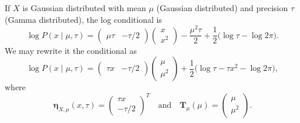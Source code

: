 \begin{exampleth}
    If \( X \) is Gaussian distributed with mean \( \mu \) (Gaussian distributed) and precision \(\tau\) (Gamma distributed), the log conditional is
    \[
         \log P(x \mid \mu, \tau) =
         \begin{pmatrix}
             \mu \tau & -\tau/2
         \end{pmatrix}
         \begin{pmatrix}
             x\\
             x^2
         \end{pmatrix}
         - \frac{\mu^{2}\tau}{2} + \frac{1}{2}\big( \log \tau - \log 2\pi \big).
    \]
    We may rewrite it the conditional as
    \[
         \log  P(x \mid \mu, \tau) =
         \begin{pmatrix}
             \tau x & -\tau/2
         \end{pmatrix}
         \begin{pmatrix}
             \mu\\
             \mu^2
         \end{pmatrix}
         + \frac{1}{2}\big( \log \tau - \tau x^2 - \log 2\pi \big),
    \]
    where
    \[
         \bm{\eta}_{X,\mu}(x,\tau) =  \begin{pmatrix}
            \tau x\\
            -\tau/2
        \end{pmatrix}^T\quad \text{and} \quad \bm{T}_\mu(\mu)=  \begin{pmatrix}
            \mu\\
            \mu^2
        \end{pmatrix}.
    \]
\end{exampleth}

